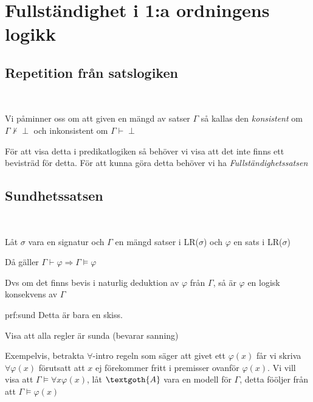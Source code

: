 \section{Fullständighet i 1:a ordningens logikk}
\par\bigskip
\subsection{Repetition från satslogiken}\hfill\\
\par\bigskip
\noindent Vi påminner oss om att given en mängd av satser $\Gamma$ så kallas den \textit{konsistent} om $\Gamma\nvdash\perp$ och inkonsistent om $\Gamma\vdash\perp$ 
\par\bigskip
\noindent För att visa detta i predikatlogiken så behöver vi visa att det inte finns ett bevisträd för detta. För att kunna göra detta behöver vi ha \textit{Fullständighetssatsen}
\par\bigskip
\subsection{Sundhetssatsen}\hfill\\\par
\noindent Låt $\sigma$ vara en signatur och $\Gamma$ en mängd satser i LR($\sigma$) och $\varphi$ en sats i LR($\sigma$)\par
\noindent Då gäller $\Gamma\vdash\varphi\Rightarrow\Gamma\vDash\varphi$\par
\noindent Dvs om det finns bevis i naturlig deduktion av $\varphi$ från $\Gamma$, så är $\varphi$ en logisk konsekvens av $\Gamma$
\par\bigskip
\begin{prf}[Sundhetssatsen]{prf:sund}
  \noindent Detta är bara en skiss.\par
  \noindent Visa att alla regler är sunda (bevarar sanning)\par
  \noindent Exempelvis, betrakta $\forall$-intro regeln som säger att givet ett $\varphi(x)$ får vi skriva $\forall \varphi(x)$ förutsatt att $x$ ej förekommer fritt i premisser ovanför $\varphi(x)$. Vi vill visa att $\Gamma\vDash\forall x \varphi(x)$, låt $\textgoth{A}$ vara en modell för $\Gamma$, detta fööljer från att $\Gamma\vDash\varphi(x)$
\end{prf}
\par\bigskip

